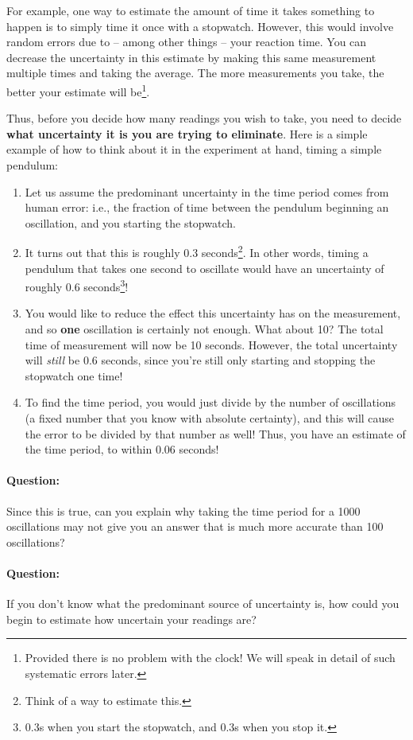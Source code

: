 For example, one way to estimate the amount of time it takes something to happen is to simply time it once with a stopwatch. However, this would involve random errors due to -- among other things -- your reaction time. You can decrease the uncertainty in this estimate by making this same measurement multiple times and taking the average. The more measurements you take, the better your estimate will be\footnote{Provided there is no problem with the clock! We will speak in detail of such systematic errors later.}.

Thus, before you decide how many readings you wish to take, you need to decide \textbf{what uncertainty it is you are trying to eliminate}. Here is a simple example of how to think about it in the experiment at hand, timing a simple pendulum:

\begin{enumerate}
    \item Let us assume the predominant uncertainty in the time period comes from human error: i.e., the fraction of time between the pendulum beginning an oscillation, and you starting the stopwatch.
    
    \item It turns out that this is roughly 0.3 seconds\footnote{Think of a way to estimate this.}. In other words, timing a pendulum that takes one second to oscillate would have an uncertainty of roughly 0.6 seconds\footnote{0.3s when you start the stopwatch, and 0.3s when you stop it.}! 
    
    \item You would like to reduce the effect this uncertainty has on the measurement, and so \textbf{one} oscillation is certainly not enough. What about 10? The total time of measurement will now be 10 seconds. However, the total uncertainty will \textit{still} be 0.6 seconds, since you're still only starting and stopping the stopwatch one time! 
    
    \item To find the time period, you would just divide by the number of oscillations (a fixed number that you know with absolute certainty), and this will cause the error to be divided by that number as well! Thus, you have an estimate of the time period, to within 0.06 seconds!
\end{enumerate}

\begin{question}
\paragraph{Question:} Since this is true, can you explain why taking the time period for a 1000 oscillations may not give you an answer that is much more accurate than 100 oscillations? ~\\

\paragraph{Question:} If you don't know what the predominant source of uncertainty is, how could you begin to estimate how uncertain your readings are?
\end{question}

